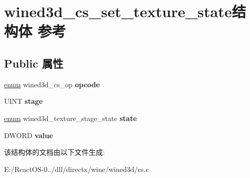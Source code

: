\hypertarget{structwined3d__cs__set__texture__state}{}\section{wined3d\+\_\+cs\+\_\+set\+\_\+texture\+\_\+state结构体 参考}
\label{structwined3d__cs__set__texture__state}
\subsection*{Public 属性}
\begin{DoxyCompactItemize}
\item 
\mbox{\label{structwined3d__cs__set__texture__state_acf2d9750a6ed81357b1f2b1298ea580e}} 
\hyperlink{interfaceenum}{enum} wined3d\+\_\+cs\+\_\+op {\bfseries opcode}
\item 
\mbox{\label{structwined3d__cs__set__texture__state_aa64fdb3bfa154f942dd43bdccb642adc}} 
U\+I\+NT {\bfseries stage}
\item 
\mbox{\label{structwined3d__cs__set__texture__state_a656657d4b539dd419b8153f245517c33}} 
\hyperlink{interfaceenum}{enum} wined3d\+\_\+texture\+\_\+stage\+\_\+state {\bfseries state}
\item 
\mbox{\label{structwined3d__cs__set__texture__state_a06456f934cebece904152e0a767c48be}} 
D\+W\+O\+RD {\bfseries value}
\end{DoxyCompactItemize}


该结构体的文档由以下文件生成\+:\begin{DoxyCompactItemize}
\item 
E\+:/\+React\+O\+S-\/0../dll/directx/wine/wined3d/cs.\+c\end{DoxyCompactItemize}
